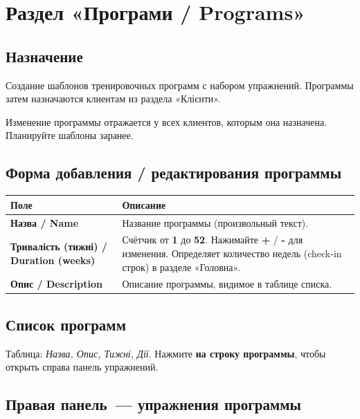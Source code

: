 \documentclass[12pt,a4paper]{article}
\begin{document}
\section{Раздел «Програми / Programs»}

\subsection{Назначение}

Создание шаблонов тренировочных программ с набором упражнений.
Программы затем назначаются клиентам из раздела «Клієнти».

\begin{notebox}
  Изменение программы отражается у всех клиентов, которым она назначена.
  Планируйте шаблоны заранее.
\end{notebox}

\subsection{Форма добавления / редактирования программы}

\begin{center}
\begin{tabularx}{0.9\textwidth}{>{\bfseries}lX}
  \toprule
  Поле & Описание \\
  \midrule
  Назва / Name &
    Название программы (произвольный текст). \\
  Тривалість (тижні) / Duration (weeks) &
    Счётчик от \textbf{1} до \textbf{52}. Нажимайте
    \textbf{+} / \textbf{-} для изменения. Определяет количество
    недель (check-in строк) в разделе «Головна». \\
  Опис / Description &
    Описание программы, видимое в таблице списка. \\
  \bottomrule
\end{tabularx}
\end{center}

\subsection{Список программ}

Таблица: \textit{Назва, Опис, Тижні, Дії}.
Нажмите \textbf{на строку программы}, чтобы открыть справа панель
упражнений.

\subsection{Правая панель~--- упражнения программы}
\end{document}
